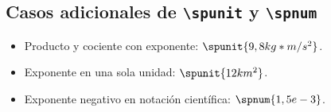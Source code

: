 \documentclass{article}
\begin{document}
\subsection*{Casos adicionales de \texttt{\textbackslash spunit} y \texttt{\textbackslash spnum}}

\begin{itemize}
  \item Producto y cociente con exponente: $\spunit{9,8 kg*m/s^{2}}$.
  \item Exponente en una sola unidad: $\spunit{12 km^{2}}$.
  \item Exponente negativo en notación científica: $\spnum{1,5e-3}$.
\end{itemize}
\end{document}
